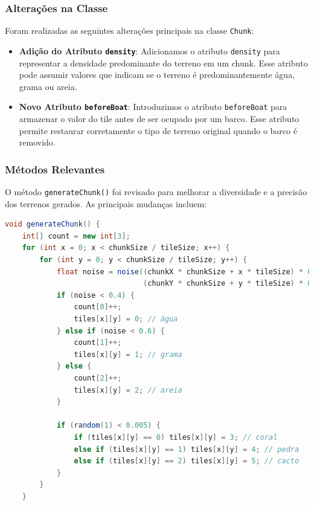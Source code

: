 \documentclass[
	12pt,				%
	oneside,			%
	a4paper,			%
	english,			%
	brazil,				%
	]{abntex2}
\begin{document}
{\subsubsection{Alterações na Classe }

Foram realizadas as seguintes alterações principais na classe \texttt{Chunk}:

\begin{itemize}
    \item \textbf{Adição do Atributo \texttt{density}}: Adicionamos o atributo \texttt{density} para representar a densidade predominante do terreno em um chunk. Esse atributo pode assumir valores que indicam se o terreno é predominantemente água, grama ou areia.
    \item \textbf{Novo Atributo \texttt{beforeBoat}}: Introduzimos o atributo \texttt{beforeBoat} para armazenar o valor do tile antes de ser ocupado por um barco. Esse atributo permite restaurar corretamente o tipo de terreno original quando o barco é removido.
\end{itemize}

\subsubsection{Métodos Relevantes}


O método \texttt{generateChunk()} foi revisado para melhorar a diversidade e a precisão dos terrenos gerados. As principais mudanças incluem:

\begin{lstlisting}[language=Java, caption={Método \texttt{generateChunk()} Modificado}]
void generateChunk() {
    int[] count = new int[3];
    for (int x = 0; x < chunkSize / tileSize; x++) {
        for (int y = 0; y < chunkSize / tileSize; y++) {
            float noise = noise((chunkX * chunkSize + x * tileSize) * 0.002, 
                                (chunkY * chunkSize + y * tileSize) * 0.002);
            if (noise < 0.4) {
                count[0]++;
                tiles[x][y] = 0; // água
            } else if (noise < 0.6) {
                count[1]++;
                tiles[x][y] = 1; // grama
            } else {
                count[2]++;
                tiles[x][y] = 2; // areia
            }

            if (random(1) < 0.005) {
                if (tiles[x][y] == 0) tiles[x][y] = 3; // coral
                else if (tiles[x][y] == 1) tiles[x][y] = 4; // pedra
                else if (tiles[x][y] == 2) tiles[x][y] = 5; // cacto
            }
        }
    }


\end{lstlisting}}
\end{document}
